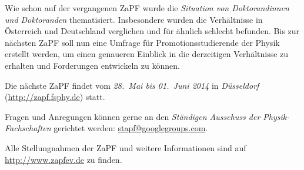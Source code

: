 \documentclass{scrartcl}
\begin{document}
Wie schon auf der vergangenen ZaPF wurde die \emph{Situation von Doktorandinnen und Doktoranden} thematisiert. Insbesondere wurden die Verh\"altnisse in \"Osterreich und Deutschland verglichen und f\"ur \"ahnlich schlecht befunden. Bis zur n\"achsten ZaPF soll nun eine Umfrage f\"ur Promotionsstudierende der Physik erstellt werden, um einen genaueren Einblick in die derzeitigen Verh\"altnisse zu erhalten und Forderungen entwickeln zu k\"onnen.

\vspace{0.5cm}
Die n\"achste ZaPF findet vom \emph{28.\ Mai bis 01.\ Juni 2014} in \emph{D\"usseldorf} (\href{http://zapf.fsphy.de/}{\url{http://zapf.fsphy.de}}) statt.

Fragen und Anregungen k\"onnen gerne an den \emph{St\"andigen Ausschuss der Physik-Fachschaften} gerichtet werden:
\href{mailto:stapf@googlegroups.com}{\url{stapf@googlegroups.com}}.

Alle Stellungnahmen der ZaPF und weitere Informationen sind auf \href{http://www.zapfev.de}{\url{http://www.zapfev.de}} zu finden.
\end{document}
